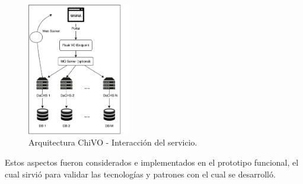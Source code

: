 \vspace{1.0cm}
\begin{figure}[h!t]
    \begin{center}
        \includegraphics[width=0.4\textwidth]{img/interaccion.png}
        \caption{Arquitectura ChiVO - Interacción del servicio.}
    \end{center}
\end{figure}

Estos aspectos fueron considerados e implementados en el prototipo funcional,
el cual sirvió para validar las tecnologías y patrones con el cual se
desarrolló.
